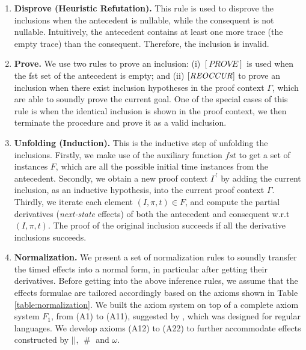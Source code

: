 \documentclass[acmsmall,10pt,review]{acmart}
\newcommand{\code}[1]{{\tt{\ensuremath{\m{#1}}}}}
\newcommand{\codeme}[1]{{\tt{\ensuremath{#1}}}}
\newcommand{\m}{\mathit}
\newcommand{\mysharp}{{\mathrel{\texttt{\#}}}}
\newcommand\tabref[1]{Table \textcolor{black}{\ref{#1}}.}
\begin{document}
{\begin{enumerate}
\item 
\textbf{Disprove (Heuristic Refutation).}
\label{Refutation}
This rule is used to disprove the inclusions when the antecedent is nullable, while the consequent is not nullable. Intuitively, the antecedent contains at least one more trace (the empty trace) than the consequent. Therefore, the inclusion is invalid. 

\vspace{-4mm}


\item 
\textbf{Prove.}
\label{Prove}
We use two rules to prove an inclusion: (i) \codeme{[PROVE]} is used when the fst set of the antecedent is empty; and (ii) $\code{[REOCCUR]}$ to prove an inclusion
when there exist inclusion hypotheses 
in the proof context $\m{\Gamma}$, which are able to soundly prove the current goal. One of the special cases of this rule is when the identical inclusion is shown in the proof context, we then terminate the procedure and prove it as a valid inclusion. 


\item 
\textbf{Unfolding (Induction).}
\label{unfolding}
This is the inductive step of unfolding the inclusions. Firstly, we make use of the auxiliary function \code{fst} to get a set of instances \code{F}, which are all the possible initial time instances from the antecedent. 
Secondly, we obtain a new proof context \code{\Gamma^\prime} by adding the current inclusion, as an inductive hypothesis, into the current proof context \code{\Gamma}. 
Thirdly, we iterate each element \code{(I, \pi, t) \in F}, and compute the partial derivatives (\emph{next-state} effects) of both the antecedent and consequent w.r.t \code{(I, \pi, t)}. The proof of the original inclusion succeeds if all the derivative inclusions succeeds.



\item 
\textbf{Normalization.}
We present a set of normalization rules to soundly transfer the timed effects into a normal form, in particular after getting their derivatives. 
Before getting into the above inference rules, we assume that the effects formulae are tailored accordingly based on the axioms shown in
\tabref{table:normalization}
We built the axiom system on top of a complete axiom system \code{F_1}, from (A1) to (A11), suggested by \cite{salomaa1966two}, which was designed for regular languages. We develop axioms (A12) to (A22) to further accommodate effects constructed by \code{||},   \code{\mysharp } and \code{\omega}.




\end{enumerate}}
\end{document}
